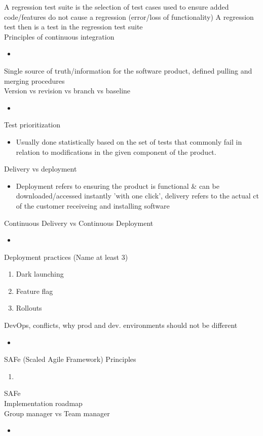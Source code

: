 \documentclass[10pt]{article}
\begin{document}
A regression test suite is the selection of test cases used to ensure added code/features do not cause a regression (error/loss of functionality)
A regression test then is a test in the regression test suite\\
Principles of continuous integration
\begin{itemize}
\item 
\end{itemize}
Single source of truth/information for the software product, defined pulling and merging procedures\\
Version vs revision vs branch vs baseline
\begin{itemize}
\item 
\end{itemize}
Test prioritization
\begin{itemize}
\item Usually done statistically based on the set of tests that commonly fail in relation to modifications in the given component of the product.
\end{itemize}
Delivery vs deployment
\begin{itemize}
\item Deployment refers to ensuring the product is functional \& can be downloaded/accessed instantly 'with one click', delivery refers to the actual ct of the customer receiveing and installing software
\end{itemize}
Continuous Delivery vs Continuous Deployment
\begin{itemize}
\item 
\end{itemize}
Deployment practices (Name at least 3)
\begin{enumerate}
\item Dark launching
\item Feature flag
\item Rollouts
\end{enumerate}
DevOps, conflicts, why prod and dev. environments should not be different
\begin{itemize}
\item 
\end{itemize}
SAFe (Scaled Agile Framework) Principles
\begin{enumerate}
\item 
\end{enumerate}
SAFe\\
Implementation roadmap\\
Group manager vs Team manager
\begin{itemize}
\item 
\end{itemize}
\end{document}
